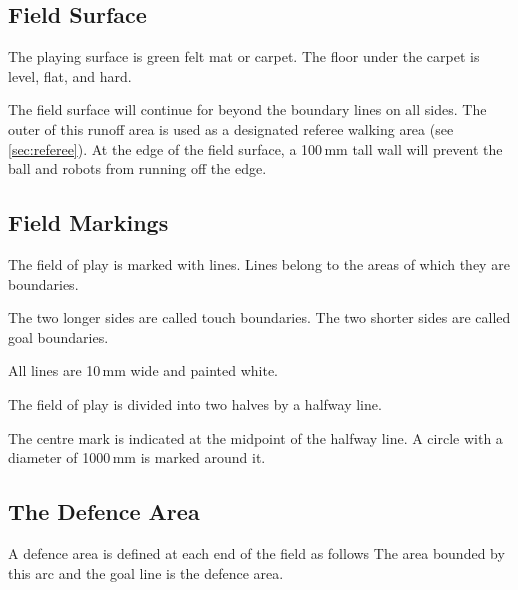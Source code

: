 \subsection{Field Surface}
The playing surface is green felt mat or carpet.
The floor under the carpet is level, flat, and hard.

The field surface will continue for  beyond
the boundary lines on all sides.
The outer  of this runoff area is used as a
designated referee walking area (see \autoref{sec:referee}).
At the edge of the field surface, a 100\,mm tall wall will prevent the ball and
robots from running off the edge.

\subsection{Field Markings}
The field of play is marked with lines.
Lines belong to the areas of which they are boundaries.

The two longer sides are called touch boundaries.
The two shorter sides are called goal boundaries.

All lines are 10\,mm wide and painted white.

The field of play is divided into two halves by a halfway line.

The centre mark is indicated at the midpoint of the halfway line.
A circle with a diameter of 1000\,mm is marked around it.

\subsection{The Defence Area}

A defence area is defined at each end of the field as follows
The area bounded by this arc and the goal line is the defence area.


